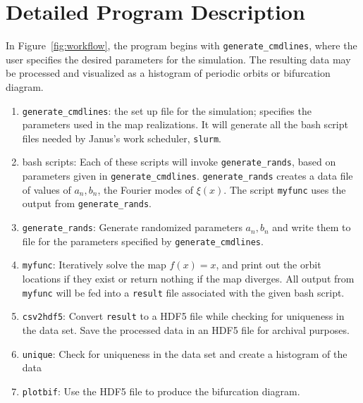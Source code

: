\section{Detailed Program Description}
In Figure~\ref{fig:workflow}, the program begins with \texttt{generate\_cmdlines}, where the user
specifies the desired parameters for the simulation. The resulting
data may be processed and visualized as a histogram of periodic orbits
or bifurcation
diagram. 
\begin{enumerate}
\item \texttt{generate\_cmdlines}: the set up file for the simulation;
specifies the parameters used in the map realizations. It will
generate all the bash script files needed by Janus's work scheduler, \texttt{slurm}.
\item bash scripts: Each of these scripts will invoke
  \texttt{generate\_rands}, based on parameters given in
  \texttt{generate\_cmdlines}. \texttt{generate\_rands} creates a data
  file of values of $a_n,b_n$, the Fourier modes of $\xi(x)$. The
  script \texttt{myfunc} uses the output from
  \texttt{generate\_rands}.
\item \texttt{generate\_rands}: Generate randomized parameters $a_n,b_n$
  and write them to file for the parameters specified by \texttt{generate\_cmdlines}.
\item \texttt{myfunc}: Iteratively solve the map $f(x) = x$, and print out
  the orbit locations if they exist or return nothing if the map
  diverges. All output from \texttt{myfunc} will be fed into a
  \texttt{result} file associated with the given bash script. 
\item \texttt{csv2hdf5}: Convert \texttt{result} to a HDF5 file
  while checking for uniqueness in the data
  set. Save the processed data in an HDF5 file for archival
  purposes. 
\item \texttt{unique}: Check for uniqueness in the data set and create a histogram of the data
\item \texttt{plotbif}: Use the HDF5 file to produce the bifurcation diagram. 
\end{enumerate}
